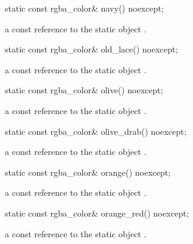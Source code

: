 \begin{itemdecl}
static const rgba_color& navy() noexcept;
\end{itemdecl}
\begin{itemdescr}
\pnum
\returns
a const reference to the static  object .
\end{itemdescr}

\begin{itemdecl}
static const rgba_color& old_lace() noexcept;
\end{itemdecl}
\begin{itemdescr}
\pnum
\returns
a const reference to the static  object .
\end{itemdescr}

\begin{itemdecl}
static const rgba_color& olive() noexcept;
\end{itemdecl}
\begin{itemdescr}
\pnum
\returns
a const reference to the static  object .
\end{itemdescr}

\begin{itemdecl}
static const rgba_color& olive_drab() noexcept;
\end{itemdecl}
\begin{itemdescr}
\pnum
\returns
a const reference to the static  object .
\end{itemdescr}

\begin{itemdecl}
static const rgba_color& orange() noexcept;
\end{itemdecl}
\begin{itemdescr}
\pnum
\returns
a const reference to the static  object .
\end{itemdescr}

\begin{itemdecl}
static const rgba_color& orange_red() noexcept;
\end{itemdecl}
\begin{itemdescr}
\pnum
\returns
a const reference to the static  object .
\end{itemdescr}

